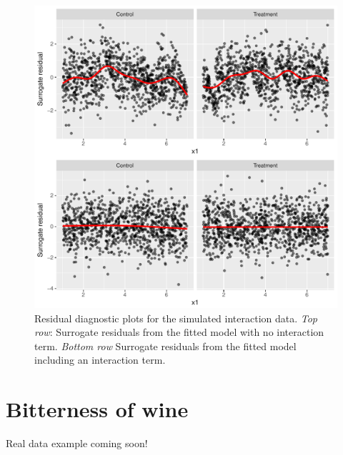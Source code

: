 \begin{figure}[!htbp]
  \centering
  \includegraphics[width=1\textwidth]{interaction}
  \caption{Residual diagnostic plots for the simulated interaction data. \textit{Top row}: Surrogate residuals from the fitted model with no interaction term. \textit{Bottom row} Surrogate residuals from the fitted model including an interaction term.}
  \label{fig:wine}
\end{figure}


\section{Bitterness of wine}

Real data example coming soon!


% 
% 
% 


